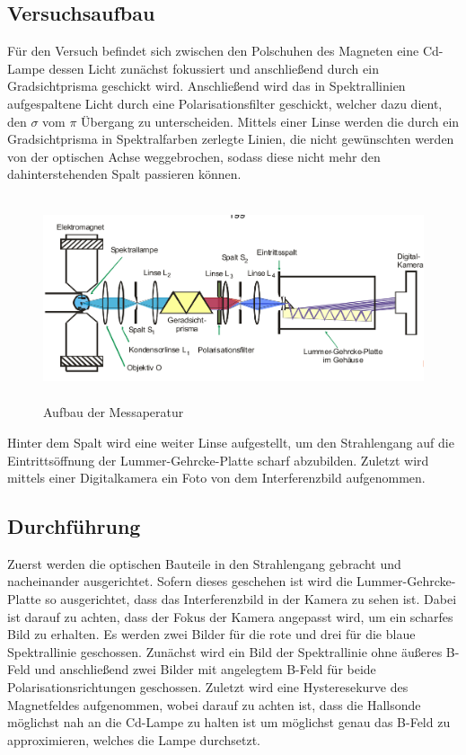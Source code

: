 \subsection{Versuchsaufbau}
Für den Versuch befindet sich zwischen den Polschuhen des Magneten eine Cd-Lampe dessen Licht zunächst fokussiert und anschließend durch ein Gradsichtprisma geschickt wird. Anschließend wird das in Spektrallinien aufgespaltene Licht durch eine Polarisationsfilter geschickt, welcher dazu dient, den $\sigma$ vom $\pi$ Übergang zu unterscheiden. Mittels einer Linse werden die durch ein Gradsichtprisma in Spektralfarben zerlegte Linien, die nicht gewünschten werden von der optischen Achse weggebrochen, sodass diese nicht mehr den dahinterstehenden Spalt passieren können.
\begin{figure}[H]
  \centering
  \includegraphics[height=6cm]{Bilder/Aufbau.png}
  \caption{Aufbau der Messaperatur \cite{V27}}
\end{figure}
Hinter dem Spalt wird eine weiter Linse aufgestellt, um den Strahlengang auf die Eintrittsöffnung der Lummer-Gehrcke-Platte scharf abzubilden. Zuletzt wird mittels einer Digitalkamera ein Foto von dem Interferenzbild aufgenommen.

\subsection{Durchführung}
Zuerst werden die optischen Bauteile in den Strahlengang gebracht und nacheinander ausgerichtet. Sofern dieses geschehen ist wird die Lummer-Gehrcke-Platte so ausgerichtet, dass das Interferenzbild in der Kamera zu sehen ist. Dabei ist darauf zu achten, dass der Fokus der Kamera angepasst wird, um ein scharfes Bild zu erhalten. Es werden zwei Bilder für die rote und drei für die blaue Spektrallinie geschossen. Zunächst wird ein Bild der Spektrallinie ohne äußeres B-Feld und anschließend zwei Bilder mit angelegtem B-Feld für beide Polarisationsrichtungen geschossen. Zuletzt wird eine Hysteresekurve des Magnetfeldes aufgenommen, wobei darauf zu achten ist, dass die Hallsonde möglichst nah an die Cd-Lampe zu halten ist um möglichst genau das B-Feld zu approximieren, welches die Lampe durchsetzt.
